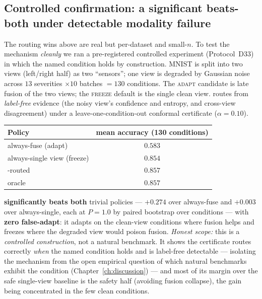 \subsection{Controlled confirmation: a significant beats-both under detectable modality failure}\label{sec:elara-controlled}

The routing wins above are real but per-dataset and small-$n$.  To test the mechanism
\emph{cleanly} we ran a pre-registered controlled experiment (Protocol~D33) in which the named
condition holds by construction.  MNIST is split into two views (left/right half) as two
``sensors''; one view is degraded by Gaussian noise across $13$ severities $\times 10$ batches
$=130$ conditions.  The \textsc{adapt} candidate is late fusion of the two views; the
\textsc{freeze} default is the single clean view.  \KGA{} routes from \emph{label-free} evidence (the
noisy view's confidence and entropy, and cross-view disagreement) under a leave-one-condition-out
conformal certificate ($\alpha=0.10$).

\begin{center}
\begin{tabular}{lc}
\toprule
Policy & mean accuracy (130 conditions) \\
\midrule
always-fuse (adapt) & $0.583$ \\
always-single view (freeze) & $0.854$ \\
\KGA{}-routed & $\mathbf{0.857}$ \\
oracle & $0.857$ \\
\bottomrule
\end{tabular}
\end{center}

\KGA{} \textbf{significantly beats both} trivial policies --- $+0.274$ over always-fuse and $+0.003$
over always-single, each at $P{=}1.0$ by paired bootstrap over conditions --- with \textbf{zero
false-adapt}: it adapts on the clean-view conditions where fusion helps and freezes where the degraded
view would poison fusion.  \emph{Honest scope:} this is a \emph{controlled construction}, not a natural
benchmark.  It shows the certificate routes correctly \emph{when} the named condition holds and is
label-free detectable --- isolating the mechanism from the open empirical question of which natural
benchmarks exhibit the condition (Chapter~\ref{ch:discussion}) --- and most of its margin over the safe
single-view baseline is the safety half (avoiding fusion collapse), the gain being concentrated in the
few clean conditions.

